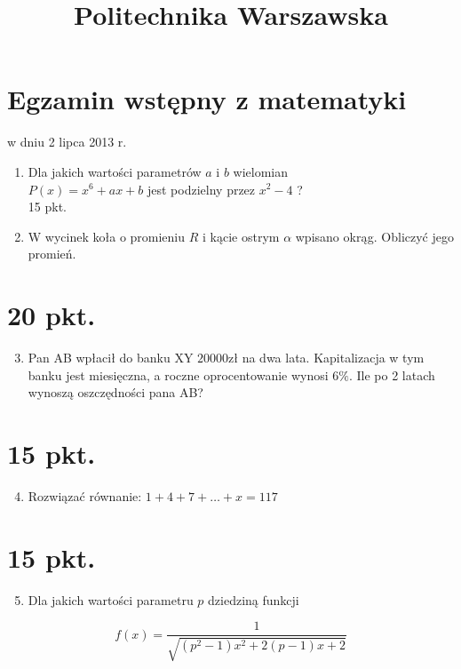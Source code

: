 \documentclass[10pt]{article}
\title{Politechnika Warszawska }
\author{}
\date{}
\begin{document}
\maketitle
\section*{Egzamin wstępny z matematyki}
w dniu 2 lipca 2013 r.

\begin{enumerate}
  \item Dla jakich wartości parametrów \(a\) i \(b\) wielomian\\
\(P(x)=x^{6}+a x+b\) jest podzielny przez \(x^{2}-4\) ?\\
15 pkt.
  \item W wycinek koła o promieniu \(R\) i kącie ostrym \(\alpha\) wpisano okrąg. Obliczyć jego promień.
\end{enumerate}

\section*{20 pkt.}
\begin{enumerate}
  \setcounter{enumi}{2}
  \item Pan AB wpłacił do banku XY \(20000 \mathrm{zł}\) na dwa lata. Kapitalizacja w tym banku jest miesięczna, a roczne oprocentowanie wynosi \(6 \%\). Ile po 2 latach wynoszą oszczędności pana AB?
\end{enumerate}

\section*{15 pkt.}
\begin{enumerate}
  \setcounter{enumi}{3}
  \item Rozwiązać równanie: \(1+4+7+\ldots+x=117\)
\end{enumerate}

\section*{15 pkt.}
\begin{enumerate}
  \setcounter{enumi}{4}
  \item Dla jakich wartości parametru \(p\) dziedziną funkcji
\end{enumerate}

\[
f(x)=\frac{1}{\sqrt{\left(p^{2}-1\right) x^{2}+2(p-1) x+2}}
\]
\end{document}
